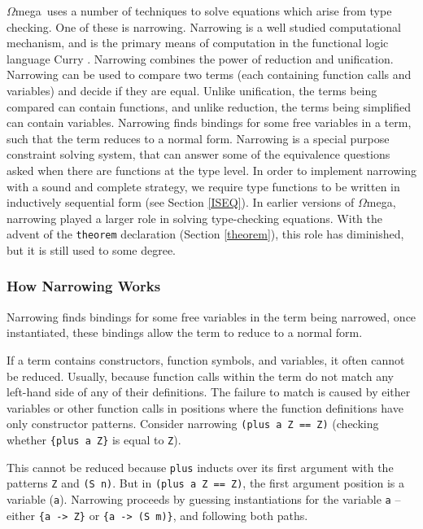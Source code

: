 \documentclass[11pt,twoside]{article}
\newcommand{\om}{$\Omega$mega}
\begin{document}
\om\ uses a number of techniques to solve equations which arise from
type checking. One of these is narrowing.
Narrowing is a well studied computational mechanism, and is the primary means of
computation in the functional logic language Curry
\cite{Hanus06Curry,journals/jflp/HanusS99}. Narrowing combines the power of reduction
and unification. Narrowing can be used to compare
two terms (each containing function calls and variables)
and decide if they are equal. Unlike unification, the terms being compared can contain functions,
and unlike reduction, the terms being simplified can contain variables. Narrowing
finds bindings for some free variables in a term, such that the term reduces to a
normal form. Narrowing is a special purpose constraint solving system,
that can answer some of the equivalence questions asked when there are functions at the type
level. In order to implement narrowing with a sound and complete strategy, we require
type functions to be written in inductively sequential form (see Section \ref{ISEQ}).
In earlier versions of \om, narrowing played a larger role
in solving type-checking equations. With the advent of the
{\tt theorem} declaration (Section \ref{theorem}), this role has
diminished, but it is still used to some degree.


\subsubsection{How Narrowing Works}

Narrowing finds bindings for some
free variables in the term being narrowed, once
instantiated, these bindings allow the term to reduce to a
normal form.

If a term contains constructors, function symbols, and
variables, it often cannot be reduced. Usually, because
function calls within the term do not match any left-hand
side of any of their definitions. The failure to match is
caused by either variables or other function calls in
positions where the function definitions have only
constructor patterns. Consider narrowing {\tt ({plus a Z} ==
Z)} (checking whether \verb+{plus a Z}+ is equal to \verb+Z+).

This cannot be reduced because {\tt plus} inducts over
its first argument with the patterns {\tt Z} and {\tt (S n)}.
But in {\tt ({plus a Z} == Z)}, the first argument position
is a variable ({\tt a}).  Narrowing proceeds by
guessing instantiations for the variable {\tt a} --
either \verb+{a -> Z}+ or \verb+{a -> (S m)}+,
and following both paths.
\end{document}
